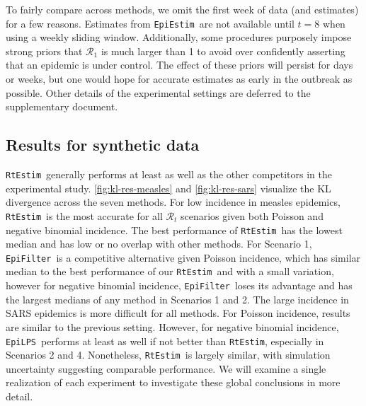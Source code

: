 \documentclass[10pt,letterpaper]{article}
\def\RtEstim{\texttt{RtEstim}}
\def\EpiEstim{\texttt{EpiEstim}}
\def\EpiLPS{\texttt{EpiLPS}}
\def\EpiFilter{\texttt{EpiFilter}}
\def\calR{\mathcal{R}}
\begin{document}
To fairly compare across methods, we omit the first week of data (and estimates)
for a few reasons. Estimates from \EpiEstim\ are not available until $t=8$ when
using a weekly sliding window. Additionally, some procedures purposely impose
strong priors that $\calR_1$ is much larger than 1 to avoid over confidently
asserting that an epidemic is under control. The effect of these priors will
persist for days or weeks, but one would hope for accurate estimates as early in
the outbreak as possible. Other details of the experimental settings are
deferred to the supplementary document. 



\subsection{Results for synthetic data}

\RtEstim\ generally performs at least as well as the other competitors in the
experimental study. \autoref{fig:kl-res-measles} and \autoref{fig:kl-res-sars}
visualize the KL divergence across the seven methods. For low incidence in
measles epidemics, \RtEstim\ is the most accurate for all $\calR_t$ scenarios
given both Poisson and negative binomial incidence. The best performance of
\RtEstim\ has the lowest median and has low or no overlap with other methods.
For Scenario 1, \EpiFilter\ is a competitive alternative given Poisson
incidence, which has similar median to the best performance of our \RtEstim\ and
with a small variation, however for negative binomial incidence, \EpiFilter\
loses its advantage and has the largest medians of any method in Scenarios 1 and
2. The large incidence in SARS epidemics is more difficult for all methods. For
Poisson incidence, results are similar to the previous setting. However, for
negative binomial incidence, \EpiLPS\ performs at least as well if not better
than \RtEstim, especially in Scenarios 2 and 4. Nonetheless, \RtEstim\ is
largely similar, with simulation uncertainty suggesting comparable performance.
We will examine a single realization of each
experiment to investigate these global conclusions in more detail.
\end{document}
